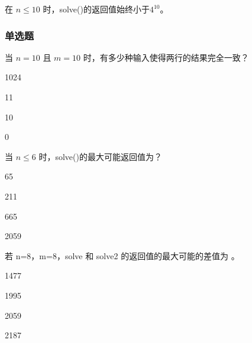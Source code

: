 \documentclass{exam-zh}
\newcommand{\true}{\paren[$\checkmark$]}
\begin{document}
\begin{question}[points=2, show-points=true]
    在 $n \le 10$ 时，solve()的返回值始终小于$4^{10}$。\true
    \begin{solution}

    \end{solution}
\end{question}





\subsubsection{单选题}
\begin{question}
    当 $n=10$ 且 $m=10$ 时，有多少种输入使得两行的结果完全一致？\paren[B]
    \begin{choices}
        \item 1024
        \item 11
        \item 10
        \item 0
    \end{choices}
\end{question}

\begin{solution}

\end{solution}

\begin{question}
    当 $n \le 6$ 时，solve()的最大可能返回值为？\paren[C]

    \begin{choices}
        \item 65
        \item 211
        \item 665
        \item 2059
    \end{choices}
\end{question}


\begin{solution}

\end{solution}


\begin{question}
    若 n=8，m=8，solve 和 solve2 的返回值的最大可能的差值为 \paren[C]。
    \begin{choices}
        \item 1477
        \item 1995
        \item 2059
        \item 2187
    \end{choices}
\end{question}
\end{document}
